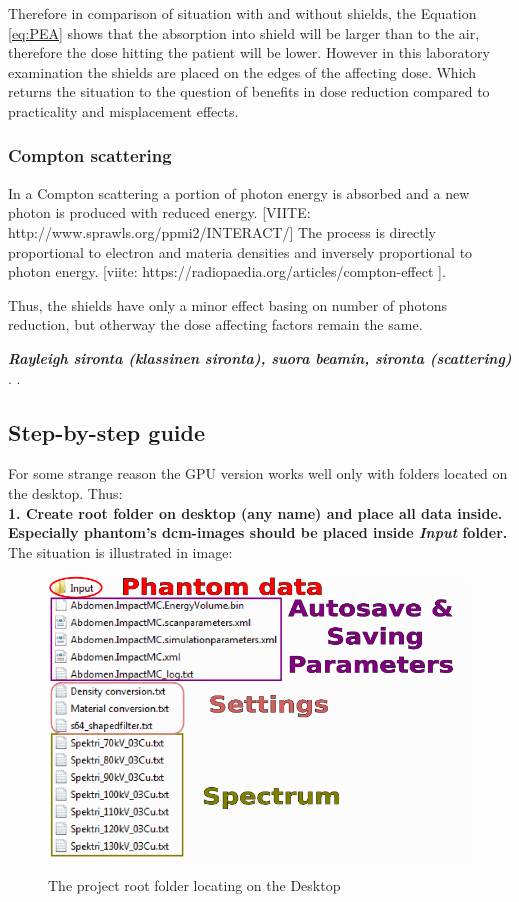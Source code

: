 \documentclass[fleqn,10pt]{SelfArx} %
\begin{document}
Therefore in comparison of situation with and without shields, the Equation \ref{eq:PEA} shows that the absorption into shield will be larger than to the air, therefore the dose hitting the patient will be lower. However in this laboratory examination the shields are placed on the edges of the affecting dose. Which returns the situation to the question of benefits in dose reduction compared to practicality and misplacement effects.

\subsubsection{Compton scattering}
In a Compton scattering a portion of photon energy is absorbed and a new photon is produced with reduced energy. [VIITE: http://www.sprawls.org/ppmi2/INTERACT/]  The process is directly proportional to electron and materia densities and inversely proportional to photon energy. [viite: https://radiopaedia.org/articles/compton-effect ].

Thus, the shields have only a minor effect basing on number of photons reduction, but otherway the dose affecting factors remain the same.



\textit{\textbf{Rayleigh sironta (klassinen sironta), suora beamin, sironta (scattering)
}}.
.

\subsection{Step-by-step guide}
For some strange reason the GPU version works well only with folders located on the desktop. Thus:\\
\textbf{1. Create root folder on desktop (any name) and place all data inside. Especially phantom's dcm-images should be placed inside  \textit{Input}  folder. }\\
The situation is illustrated in image: \\
\begin{figure}[ht]\centering
\includegraphics[width=\linewidth]{folderStructure}
\caption{The project root folder locating on the Desktop}
\label{fig:folderStructure}
\end{figure}
\end{document}
